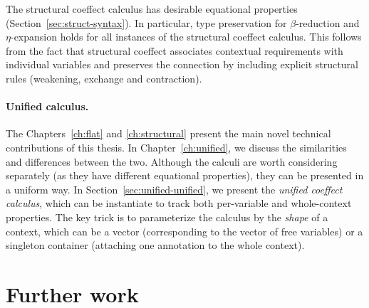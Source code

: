 The structural coeffect calculus has desirable equational properties (Section~\ref{sec:struct-syntax}).
In particular, type preservation for $\beta$-reduction and $\eta$-expansion holds for all instances of the
structural coeffect calculus. This follows from the fact that structural coeffect
associates contextual requirements with individual variables and preserves the connection by
including explicit structural rules (weakening, exchange and contraction).


\paragraph{Unified calculus.}

The Chapters~\ref{ch:flat} and \ref{ch:structural} present the main novel technical contributions of this
thesis. In Chapter~\ref{ch:unified}, we discuss the similarities and differences between the two.
Although the calculi are worth considering separately (as they have different equational properties),
they can be presented in a uniform way. In Section~\ref{sec:unified-unified}, we present the
\emph{unified coeffect calculus}, which can be instantiate to track both per-variable and
whole-context properties. The key trick is to parameterize the calculus by the \emph{shape} of
a context, which can be a vector (corresponding to the vector of free variables) or a singleton
container (attaching one annotation to the whole context).

%
%

\section{Further work}
\label{sec:conc-further}


